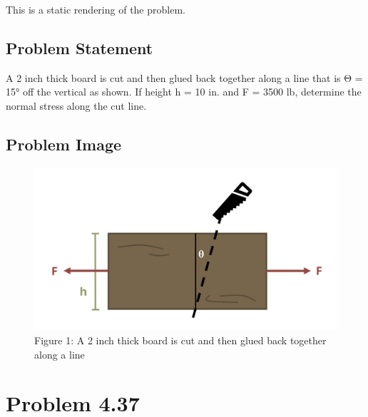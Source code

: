 \documentclass[
  letterpaper,
  DIV=11,
  numbers=noendperiod]{scrreprt}
\begin{document}

This is a static rendering of the problem.

\section*{Problem Statement}\label{problem-statement-5}


A 2 inch thick board is cut and then glued back together along a line
that is Θ = 15° off the vertical as shown. If height h = 10 in. and F =
3500 lb, determine the normal stress along the cut line.

\section*{Problem Image}\label{problem-image-15}


\begin{figure}[H]

{\centering \includegraphics{images/156.png}

}

\caption{Figure 1: A 2 inch thick board is cut and then glued back
together along a line}

\end{figure}%

\chapter*{Problem 4.37}\label{problem-4.37-1}

\end{document}
